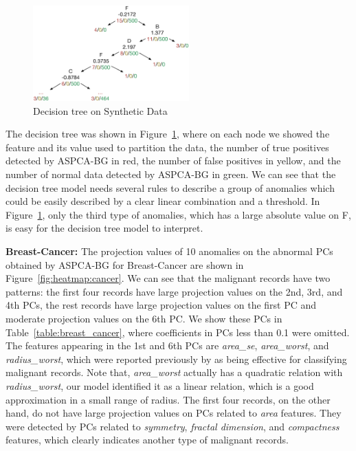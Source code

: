 \begin{figure}
	\centering
	\includegraphics[width=60mm]{figure/new/Synthetic-DT}
	\caption{Decision tree on Synthetic Data}
\label{fig:dt:synthetic}
\end{figure}

The decision tree was shown in Figure~\ref{fig:dt:synthetic}, where on each node we showed the feature and its value used to partition the data, the number of true positives detected by ASPCA-BG in red, the number of false positives in yellow, and the number of normal data detected by ASPCA-BG in green. We can see that the decision tree model needs several rules to describe a group of anomalies which could be easily described by a clear linear combination and a threshold. In Figure~\ref{fig:dt:synthetic}, only the third type of anomalies, which has a large absolute value on F, is easy for the decision tree model to interpret.

{\bf Breast-Cancer:}
The projection values of 10 anomalies on the abnormal PCs obtained by ASPCA-BG for Breast-Cancer are shown in Figure~\ref{fig:heatmap:cancer}.  We can see that the malignant records have two patterns: the first four records have large projection values on the 2nd, 3rd, and 4th PCs, the rest records have large projection values on the first PC and moderate projection values on the 6th PC. We show these PCs in Table~\ref{table:breast_cancer}, where coefficients in PCs less than 0.1 were omitted.  The features appearing in the 1st and 6th PCs are \emph{area\_se}, \emph{area\_worst}, and \emph{radius\_worst}, which were reported previously by \cite{Wolberg1995792} as being effective for classifying malignant records.  Note that, \emph{area\_worst} actually has a quadratic relation with \emph{radius\_worst}, our model identified it as a linear relation, which is a good approximation in a small range of radius. The first four records, on the other hand, do not have large projection values on PCs related to \emph{area} features.  They were detected by PCs related to \emph{symmetry}, \emph{fractal dimension}, and \emph{compactness} features, which clearly indicates another type of malignant records.

